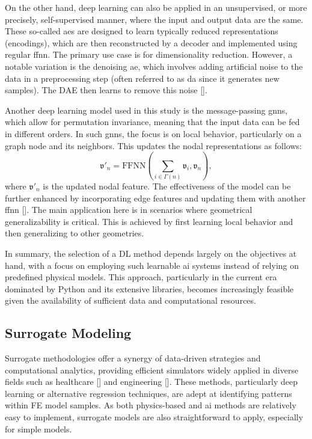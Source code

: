 \documentclass[12pt,a4paper]{report}
\begin{document}
On the other hand, deep learning can also be applied in an unsupervised, or more precisely, self-supervised manner, where the input and output data are the same. These so-called \acp{ae} are designed to learn typically reduced representations (encodings), which are then reconstructed by a decoder and implemented using regular \ac{ffnn}. The primary use case is for dimensionality reduction. However, a notable variation is the denoising \ac{ae}, which involves adding artificial noise to the data in a preprocessing step (often referred to as \ac{da} since it generates new samples). The DAE then learns to remove this noise [\cite{hinton2006,vincent2008}].

Another deep learning model used in this study is the message-passing \acp{gnn}, which allow for permutation invariance, meaning that the input data can be fed in different orders. In such \acp{gnn}, the focus is on local behavior, particularly on a graph node and its neighbors. This updates the nodal representations as follows:
%
\begin{equation}
\label{eq:gnn}
\mathfrak{v}'_n = \text{FFNN} \left(\sum_{i \in \Gamma(n)}\mathfrak{v}_i, \mathfrak{v}_n\right),
\end{equation}
%
where $\mathfrak{v}'_n$ is the updated nodal feature. The effectiveness of the model can be further enhanced by incorporating edge features and updating them with another \ac{ffnn} [\cite{cai2018,zhou2020,wu2021}]. The main application here is in scenarios where geometrical generalizability is critical. This is achieved by first learning local behavior and then generalizing to other geometries.

In summary, the selection of a DL method depends largely on the objectives at hand, with a focus on employing such learnable \ac{ai} systems instead of relying on predefined physical models. This approach, particularly in the current era dominated by Python and its extensive libraries, becomes increasingly feasible given the availability of sufficient data and computational resources.

\subsection{Surrogate Modeling}
%
Surrogate methodologies offer a synergy of data-driven strategies and computational analytics, providing efficient simulators widely applied in diverse fields such as healthcare [\cite{holzapfel2021,shim2020,liang2018b}] and engineering [\cite{pfaff2021,gao2020b,kalyuzhnyuk2019}]. These methods, particularly deep learning or alternative regression techniques, are adept at identifying patterns within FE model samples. As both physics-based and \ac{ai} methods are relatively easy to implement, surrogate models are also straightforward to apply, especially for simple models.
\end{document}
